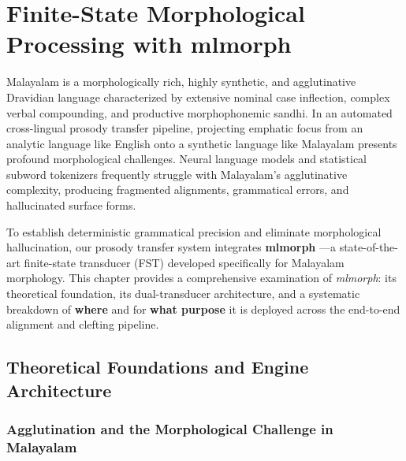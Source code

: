 \chapter{Finite-State Morphological Processing with mlmorph}
\label{chap:mlmorph}

Malayalam is a morphologically rich, highly synthetic, and agglutinative Dravidian language characterized by extensive nominal case inflection, complex verbal compounding, and productive morphophonemic sandhi. In an automated cross-lingual prosody transfer pipeline, projecting emphatic focus from an analytic language like English onto a synthetic language like Malayalam presents profound morphological challenges. Neural language models and statistical subword tokenizers frequently struggle with Malayalam's agglutinative complexity, producing fragmented alignments, grammatical errors, and hallucinated surface forms.

To establish deterministic grammatical precision and eliminate morphological hallucination, our prosody transfer system integrates \textbf{mlmorph} \citep{thottingal2019finite}—a state-of-the-art finite-state transducer (FST) developed specifically for Malayalam morphology. This chapter provides a comprehensive examination of \textit{mlmorph}: its theoretical foundation, its dual-transducer architecture, and a systematic breakdown of \textbf{where} and for \textbf{what purpose} it is deployed across the end-to-end alignment and clefting pipeline.


\section{Theoretical Foundations and Engine Architecture}
\label{sec:mlmorph_architecture}

\subsection{Agglutination and the Morphological Challenge in Malayalam}


